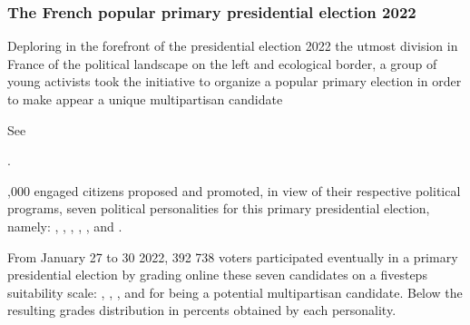 \documentclass[a4paper,12pt,english]{sphinxhowto}
\begin{document}
\subsubsection{The French popular primary presidential election 2022}
\label{\detokenize{pearls:the-french-popular-primary-presidential-election-2022}}
\sphinxAtStartPar
Deploring in the forefront of the presidential election 2022 the utmost division in France of the political landscape on the left and ecological border, a group of young activists took the initiative to organize a popular primary election in order to make appear a unique multipartisan candidate %
\begin{footnote}[10]\sphinxAtStartFootnote
See 
%
\end{footnote}.

,000 engaged citizens proposed and promoted, in view of their respective political programs, seven political personalities for this primary presidential election, namely:  , , , , ,  and .

\sphinxAtStartPar
From January 27 to 30 2022, 392 738 voters participated eventually in a primary presidential election by grading on\sphinxhyphen{}line these seven candidates on a five\sphinxhyphen{}steps suitability scale: , , ,  and  for being a potential multipartisan candidate. Below the resulting grades distribution in percents obtained by each personality.
\end{document}
